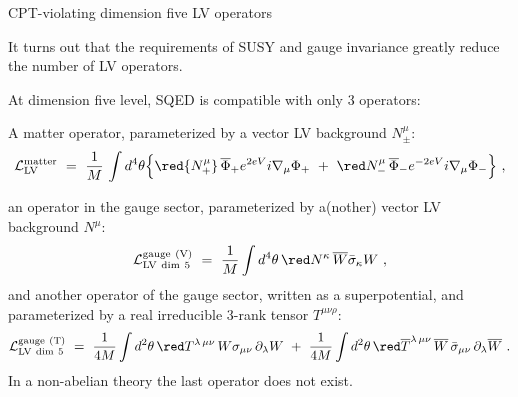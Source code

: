 \documentclass[pdf,PItalk,slideColor,colorBG,accumulate]{prosper}
\newcommand{\myit}{\usefont{T1}{ppl}{m}{it}\fontsize{8pt}{6pt}\selectfont}
\begin{document}
{
\begin{slide}{ CPT-violating dimension five LV operators }
{
}
	
	It turns out that the requirements of SUSY and gauge invariance
	greatly reduce the number of LV operators.

	At dimension five level, SQED is compatible with only 3 operators:

	A matter operator, parameterized by a vector LV background
	{\red $ N_\pm^\mu $}:
\[
  \mathcal{L}_{\mathrm{LV}}^{\mathrm{matter}} ~=~ 
\frac{1}{M}\,   \int d^4\theta \Big\{ 
{\red{N_+^\mu}}\, \overline{\Phi}_+ e^{2eV} i \nabla_\mu \Phi_+ 
~+~ 
{\red N_{-}^\mu}\, \overline{\Phi}_- e^{-2eV} i \nabla_\mu  {\Phi}_-
                 \Big\}~, 
\]
%
	
	an operator in the gauge sector, parameterized by a(nother)
	vector LV background {\red $ N^\mu $}:
\[
\mathcal{L}_{\mathrm{LV\ dim\ 5}}^{\mathrm{gauge\ (V)}} ~=~ 
\frac 1M \int d^4\theta \, 
{\red N^\kappa}\, \overline{W} \bar{\sigma}_\kappa W~,   
\]
%
	and another operator of the gauge sector, written as a 
	superpotential, and parameterized
	by a {\myit real irreducible 3-rank tensor} {\red $T^{\mu\nu\rho}$}:
\[
\mathcal{L}_{\mathrm{LV\ dim\ 5}}^{\mathrm{gauge\ (T)}} ~=~ 
\frac 1{4M} 
\int d^2\theta \, {\red T^{\lambda\, \mu\nu}} \,
        W \sigma_{\mu\nu} \, \partial_\lambda W  
~+~ \frac 1{4M} 
\int d^2\theta \, {\red \overline{T}^{\lambda\, \mu\nu}} \,
        \overline{W} \,\bar{\sigma}_{\mu\nu}\, \partial_\lambda\overline{W}  
~.
\]
%
	In a non-abelian theory the last operator does not exist.
\end{slide}
}

\end{document}
